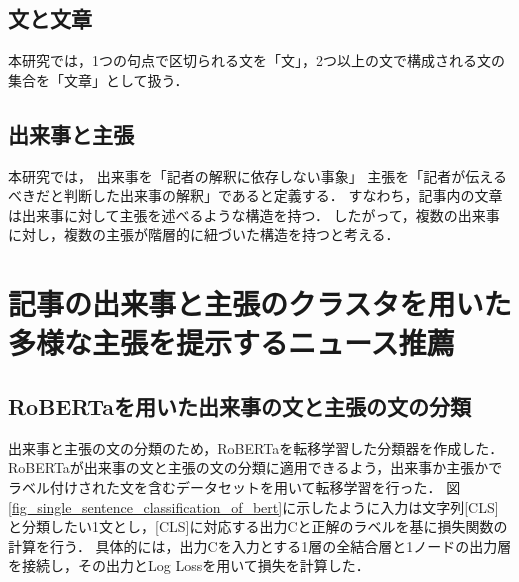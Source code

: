 \documentclass[12pt,a4j]{jreport}
\begin{document}
\subsection{文と文章}
本研究では，1つの句点で区切られる文を「文」，2つ以上の文で構成される文の集合を「文章」として扱う．

\subsection{出来事と主張}
本研究では，
出来事を「記者の解釈に依存しない事象」
主張を「記者が伝えるべきだと判断した出来事の解釈」であると定義する．
すなわち，記事内の文章は出来事に対して主張を述べるような構造を持つ．
したがって，複数の出来事に対し，複数の主張が階層的に紐づいた構造を持つと考える．


\section{記事の出来事と主張のクラスタを用いた多様な主張を提示するニュース推薦}
\label{section_method_detail}



\subsection{RoBERTaを用いた出来事の文と主張の文の分類}
\label{subsection_classify_method}
出来事と主張の文の分類のため，RoBERTaを転移学習した分類器を作成した．
RoBERTaが出来事の文と主張の文の分類に適用できるよう，出来事か主張かでラベル付けされた文を含むデータセットを用いて転移学習を行った．
図\ref{fig_single_sentence_classification_of_bert}に示したように入力は文字列[CLS]と分類したい1文とし，[CLS]に対応する出力Cと正解のラベルを基に損失関数の計算を行う．
具体的には，出力Cを入力とする1層の全結合層と1ノードの出力層を接続し，その出力とLog Lossを用いて損失を計算した．
\end{document}
